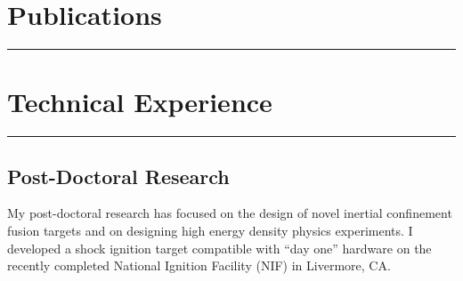 \documentclass[letterpaper,11pt]{article}
\begin{document}


\section*{Publications}
\hrule
\vspace{0.05in}













\section*{Technical Experience}
\hrule
\vspace{0.05in}

\subsection*{Post-Doctoral Research}
My post-doctoral research has focused on the design of novel inertial
confinement fusion targets and on designing high energy density physics
experiments.  I developed a shock ignition target compatible with ``day one''
hardware on the recently completed National Ignition Facility (NIF) in
Livermore, CA.
\end{document}
